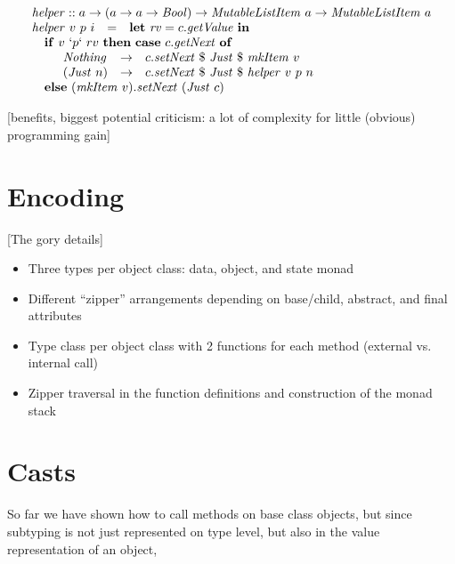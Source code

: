 \documentclass[runningheads,a4paper]{llncs}
\newcommand{\todo}[1]{[{\color{blue}#1}]}
\begin{document}
\begin{displaymath}
\begin{array}{lcl}
\multicolumn{3}{l}{\mathit{helper} :: a \to (a \to a \to \mathit{Bool}) \to \mathit{MutableListItem}~a \to \mathit{MutableListItem}~a} \\
\mathit{helper}~v~p~i & = & \mathbf{let}~\mathit{rv} = c.\mathit{getValue}~\mathbf{in}\\
\multicolumn{3}{l}{\quad \mathbf{if}~v~`p`~rv~\mathbf{then}~\mathbf{case}~c.\mathit{getNext}~\mathbf{of}} \\
\multicolumn{3}{l}{\quad \quad \begin{array}{lcl}
\mathit{Nothing} & \to & c.\mathit{setNext}~\$~\mathit{Just}~\$~\mathit{mkItem}~v \\
(\mathit{Just}~n) & \to & c.\mathit{setNext}~\$~\mathit{Just}~\$~\mathit{helper}~v~p~n 
\end{array}} \\
\multicolumn{3}{l}{\quad \mathbf{else}~(\mathit{mkItem}~v).\mathit{setNext}~(\mathit{Just}~c)}
\end{array}
\end{displaymath}
   
\todo{benefits, biggest potential criticism: a lot of complexity for little (obvious) programming gain}

\section{Encoding}
\label{sec:encoding}

\todo{The gory details}

\begin{itemize}
\item Three types per object class: data, object, and state monad
\item Different ``zipper'' arrangements depending on base/child, abstract, and final attributes
\item Type class per object class with 2 functions for each method (external vs. internal call)
\item Zipper traversal in the function definitions and construction of the monad stack
\end{itemize}

\section{Casts}
\label{sec:casts}

So far we have shown how to call methods on base class objects, but since subtyping is not just represented on type level, but also in the value representation of an object, 
\end{document}
